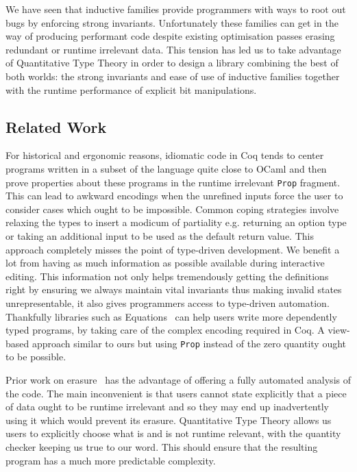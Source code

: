 \documentclass{article}
\newcommand{\coq}{Coq}
\begin{document}
We have seen that inductive families provide programmers with ways to root out bugs
by enforcing strong invariants. Unfortunately these families can get in the way of
producing performant code despite existing optimisation passes erasing redundant
or runtime irrelevant data.
%
This tension has led us to take advantage of Quantitative Type Theory
in order to design a library
combining the best of both worlds: the strong invariants and ease of use of inductive
families together with the runtime performance of explicit bit manipulations.

\subsection{Related Work}

For historical and ergonomic reasons, idiomatic code in \coq{} tends to center programs
written in a subset of the language quite close to OCaml and then prove properties
about these programs in the runtime irrelevant \texttt{Prop} fragment.
%
This can lead to awkward encodings when the unrefined inputs force the user to consider
cases which ought to be impossible. Common coping strategies involve relaxing the types
to insert a modicum of partiality e.g. returning an option type or taking an additional
input to be used as the default return value.
%
This approach completely misses the point of type-driven development.
%
We benefit a lot from having as much information as possible available during
interactive editing.
%
This information not only helps tremendously getting the definitions right by
ensuring we always maintain vital invariants thus making invalid states
unrepresentable, it also gives programmers access to type-driven automation.
%
Thankfully libraries such as Equations~\cite{DBLP:conf/itp/Sozeau10,DBLP:journals/pacmpl/SozeauM19}
can help users write more dependently typed programs, by taking care of the complex
encoding required in \coq{}. A view-based approach similar to ours but using \texttt{Prop}
instead of the zero quantity ought to be possible.

Prior work on erasure~\cite{DBLP:journals/pacmpl/Tejiscak20} has the advantage of
offering a fully automated analysis of the code. The main inconvenient is that users
cannot state explicitly that a piece of data ought to be runtime irrelevant and so
they may end up inadvertently using it which would prevent its erasure.
%
Quantitative Type Theory allows us users to explicitly choose what is and is not
runtime relevant, with the quantity checker keeping us true to our word.
%
This should ensure that the resulting program has a much more predictable complexity.
\end{document}
